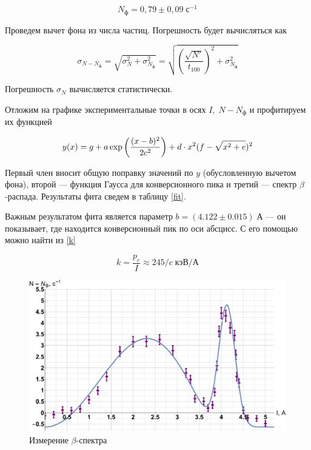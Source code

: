 \documentclass[12pt]{kiarticle} %
\newcommand{\be}{\ensuremath{\beta}}
\begin{document}
	\begin{equation}\label{}
	N_ф = 0,79 \pm 0,09 \; с^{-1}
	\end{equation}

	Проведем вычет фона из числа частиц. Погрешность будет вычисляться как

	\begin{equation}\label{}
	\sigma_{N - N_ф} = \sqrt{\sigma_N^2 + \sigma_{N_ф}^2} = \sqrt{\left( \dfrac{\sqrt{N'}}{t_{100}} \right) ^2 + \sigma_{N_ф}^2} 
	\end{equation}  

	Погрешность $ \sigma_N $ вычисляется статистически. 

	Отложим на графике экспериментальные точки в осях $ I, \; N-N_ф $ и профитируем их функцией 

	\begin{equation}\label{}
	y(x) = g + a \exp\left( \dfrac{(x - b)^2}{2c^2} \right) + d\cdot x^2(f - \sqrt{x^2 + e})^2
	\end{equation}

	Первый член вносит общую поправку значений по $ y $ (обусловленную вычетом фона), второй --- функция Гаусса для конверсионного пика и третий --- спектр \be-распада. Результаты фита сведем в таблицу \ref{fit}.

	Важным результатом фита является параметр $ b = (4.122 \pm 0.015) \; А $ --- он показывает, где находится конверсионный пик по оси абсцисс. С его помощью можно найти из \eqref{k} 

	\begin{equation}\label{}
	k = \dfrac{p_c}{I} \approx 245/c \; кэВ / А
	\end{equation}

		\begin{figure}[H]
		\label{graf_4}
		\includegraphics[scale=0.47]{graf.pdf}
		\caption{Измерение \be-спектра}
	\end{figure}
\end{document}
